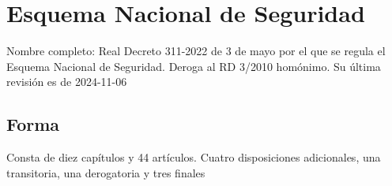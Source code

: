 \section{Esquema Nacional de Seguridad}

Nombre completo: Real Decreto 311-2022 de 3 de mayo por el que se regula el Esquema Nacional de Seguridad. Deroga al RD 3/2010 homónimo. Su última revisión es de 2024-11-06 

\localtableofcontents

\subsection{Forma}
Consta de diez capítulos y 44 artículos. Cuatro disposiciones adicionales, una transitoria, una derogatoria y tres finales